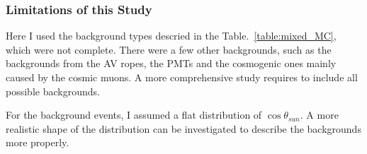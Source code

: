 

\subsubsection{Limitations of this Study}
Here I used the background types descried in the Table.~\ref{table:mixed_MC}, which were not complete. There were a few other backgrounds, such as the backgrounds from the AV ropes, the PMTs and the cosmogenic ones mainly caused by the cosmic muons. A more comprehensive study requires to include all possible backgrounds.

For the background events, I assumed a flat distribution of $\cos\theta_{sun}$. A more realistic shape of the distribution can be investigated to describe the backgrounds more properly.

